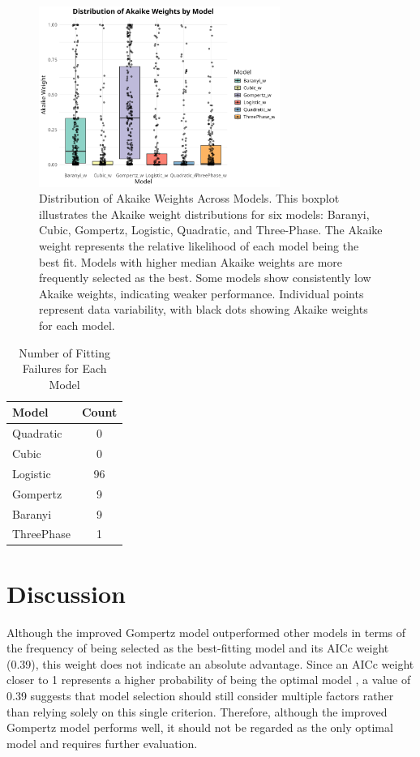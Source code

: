 \documentclass[12pt]{article}
\begin{document}
\begin{figure}[H]
    \centering
    \includegraphics[width=0.7\textwidth]{../results/akaike_weights_boxplot_nice.png}
    \caption{Distribution of Akaike Weights Across Models. This boxplot illustrates the Akaike weight distributions for six models: Baranyi, Cubic, Gompertz, Logistic, Quadratic, and Three-Phase. The Akaike weight represents the relative likelihood of each model being the best fit. Models with higher median Akaike weights are more frequently selected as the best. Some models show consistently low Akaike weights, indicating weaker performance. Individual points represent data variability, with black dots showing Akaike weights for each model.}
    \label{fig:akaike_weights}
\end{figure}

\begin{table}[htbp]
\centering
\caption{Number of Fitting Failures for Each Model}
\label{tab:fitting_failures}
\begin{tabular}{l c}
\hline
Model & Count \\
\hline
Quadratic & 0 \\
Cubic     & 0 \\
Logistic  & 96 \\
Gompertz  & 9 \\
Baranyi   & 9 \\
ThreePhase& 1 \\
\hline
\end{tabular}
\end{table}

\section{Discussion}
Although the improved Gompertz model outperformed other models in terms of the frequency of being selected as the best-fitting model and its AICc weight (0.39), this weight does not indicate an absolute advantage. Since an AICc weight closer to 1 represents a higher probability of being the optimal model \citep{JohnsonOmland2004}, a value of 0.39 suggests that model selection should still consider multiple factors rather than relying solely on this single criterion. Therefore, although the improved Gompertz model performs well, it should not be regarded as the only optimal model and requires further evaluation.
\end{document}
